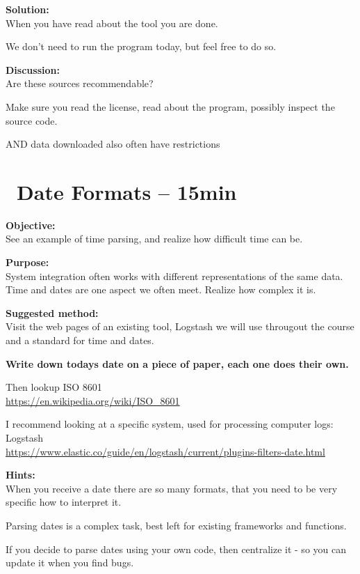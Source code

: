 \documentclass[a4paper,11pt,notitlepage]{report}
\begin{document}
{\bf Solution:}\\
When you have read about the tool you are done.

We don't need to run the program today, but feel free to do so.

{\bf Discussion:}\\
Are these sources recommendable?

Make sure you read the license, read about the program, possibly inspect the source code.

AND data downloaded also often have restrictions


\chapter{\faExclamationTriangle\ Date Formats -- 15min}
\label{ex:dateformats}


{\bf Objective:}\\
See an example of time parsing, and realize how difficult time can be.

{\bf Purpose:}\\
System integration often works with different representations of the same data. Time and dates are one aspect we often meet. Realize how complex it is.

{\bf Suggested method:}\\
Visit the web pages of an existing tool, Logstash we will use througout the course and a standard for time and dates.

{\bf Write down todays date on a piece of paper, each one does their own.}

Then lookup ISO 8601\\
\url{https://en.wikipedia.org/wiki/ISO_8601}

I recommend looking at a specific system, used for processing computer logs:
Logstash \\
\url{https://www.elastic.co/guide/en/logstash/current/plugins-filters-date.html}


{\bf Hints:}\\
When you receive a date there are so many formats, that you need to be very specific how to interpret it.

Parsing dates is a complex task, best left for existing frameworks and functions.

If you decide to parse dates using your own code, then centralize it - so you can update it when you find bugs.
\end{document}
